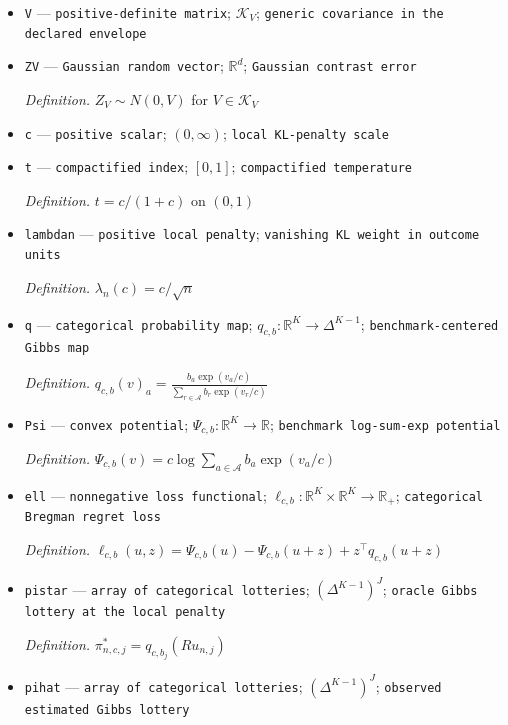 \documentclass{article}
\begin{document}
\begin{itemize}
  \item \texttt{V} --- \texttt{positive-\allowbreak{}definite matrix}; \(\mathcal K_V\); \texttt{generic covariance in the declared envelope}
  \item \texttt{ZV} --- \texttt{Gaussian random vector}; \(\mathbb R^d\); \texttt{Gaussian contrast error}
  \par\smallskip\noindent\emph{Definition.} \(Z_V\sim N(0,V)\) for \(V\in\mathcal K_V\)
  \item \texttt{c} --- \texttt{positive scalar}; \((0,\infty)\); \texttt{local KL-\allowbreak{}penalty scale}
  \item \texttt{t} --- \texttt{compactified index}; \([0,1]\); \texttt{compactified temperature}
  \par\smallskip\noindent\emph{Definition.} \(t=c/(1+c)\) on \((0,1)\)
  \item \texttt{lambdan} --- \texttt{positive local penalty}; \texttt{vanishing KL weight in outcome units}
  \par\smallskip\noindent\emph{Definition.} \(\lambda_n(c)=c/\sqrt n\)
  \item \texttt{q} --- \texttt{categorical probability map}; \(q_{c,b}:\mathbb R^K\to\Delta^{K-1}\); \texttt{benchmark-\allowbreak{}centered Gibbs map}
  \par\smallskip\noindent\emph{Definition.} \(q_{c,b}(v)_a=\frac{b_a\exp(v_a/c)}{\sum_{r\in\mathcal A}b_r\exp(v_r/c)}\)
  \item \texttt{Psi} --- \texttt{convex potential}; \(\Psi_{c,b}:\mathbb R^K\to\mathbb R\); \texttt{benchmark log-\allowbreak{}sum-\allowbreak{}exp potential}
  \par\smallskip\noindent\emph{Definition.} \(\Psi_{c,b}(v)=c\log\sum_{a\in\mathcal A}b_a\exp(v_a/c)\)
  \item \texttt{ell} --- \texttt{nonnegative loss functional}; \(\ell_{c,b}:\mathbb R^K\times\mathbb R^K\to\mathbb R_+\); \texttt{categorical Bregman regret loss}
  \par\smallskip\noindent\emph{Definition.} \(\ell_{c,b}(u,z)=\Psi_{c,b}(u)-\Psi_{c,b}(u+z)+z^{\top}q_{c,b}(u+z)\)
  \item \texttt{pistar} --- \texttt{array of categorical lotteries}; \((\Delta^{K-1})^J\); \texttt{oracle Gibbs lottery at the local penalty}
  \par\smallskip\noindent\emph{Definition.} \(\pi^*_{n,c,j}=q_{c,b_j}(Ru_{n,j})\)
  \item \texttt{pihat} --- \texttt{array of categorical lotteries}; \((\Delta^{K-1})^J\); \texttt{observed estimated Gibbs lottery}

\end{itemize}
\end{document}
